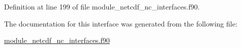 Definition at line 199 of file module\+\_\+netcdf\+\_\+nc\+\_\+interfaces.\+f90.



The documentation for this interface was generated from the following file\+:\begin{DoxyCompactItemize}
\item 
\hyperlink{module__netcdf__nc__interfaces_8f90}{module\+\_\+netcdf\+\_\+nc\+\_\+interfaces.\+f90}\end{DoxyCompactItemize}
